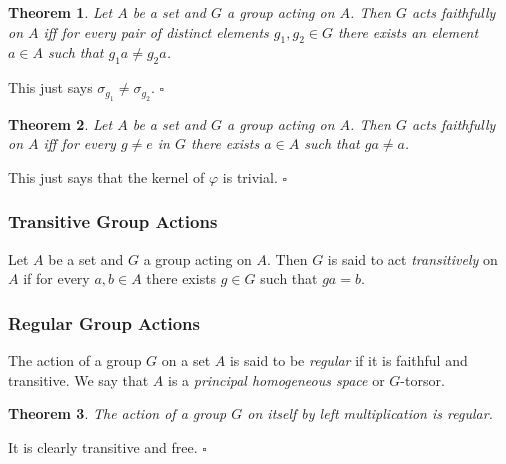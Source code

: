 \documentclass[10pt]{article}
\newtheorem{theorem}{Theorem}[section]
\newenvironment{proof}[1][Proof]{\begin{trivlist}
\item[\hskip \labelsep {\itshape #1}]}{\end{trivlist}}
\newenvironment{definition}[1][Definition]{\begin{trivlist}
\item[\hskip \labelsep {\bfseries #1}]}{\end{trivlist}}
\begin{document}
\begin{theorem}
Let $A$ be a set and $G$ a group acting on $A$. Then $G$ acts faithfully on $A$ iff for every pair of distinct elements $g_1, g_2 \in G$ there exists an element $a \in A$ such that $g_1a \neq g_2a$.
\end{theorem}

\begin{proof}
This just says $\sigma_{g_1} \neq \sigma_{g_2}$. $\square$
\end{proof}

\begin{theorem}
Let $A$ be a set and $G$ a group acting on $A$. Then $G$ acts faithfully on $A$ iff for every $g \neq e$ in $G$ there exists $a \in A$ such that $ga \neq a$.
\end{theorem}

\begin{proof}
This just says that the kernel of $\varphi$ is trivial. $\square$
\end{proof}

\subsubsection{Transitive Group Actions}

\begin{definition}
Let $A$ be a set and $G$ a group acting on $A$. Then $G$ is said to act \emph{transitively} on $A$ if for every $a, b \in A$ there exists $g \in G$ such that $ga = b$.
\end{definition}

\subsubsection{Regular Group Actions}

\begin{definition}
The action of a group $G$ on a set $A$ is said to be \emph{regular} if it is faithful and transitive. We say that $A$ is a \emph{principal homogeneous space} or $G$-torsor.
\end{definition}

\begin{theorem}
The action of a group $G$ on itself by left multiplication is regular.
\end{theorem}

\begin{proof}
It is clearly transitive and free. $\square$
\end{proof}
\end{document}
